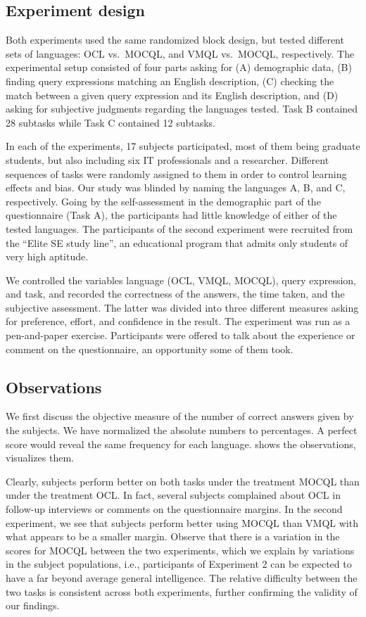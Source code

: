 \documentclass{llncs}
\newcommand{\MMQ}{MOCQL\xspace}
\begin{document}
\subsection{Experiment design}

Both experiments used the same randomized block design, but tested different sets of languages: OCL vs.\ \MMQ, and VMQL vs.\ \MMQ, respectively. The experimental setup consisted of four parts asking for (A) demographic data, (B) finding query expressions matching an English description, (C) checking the match between a given query expression and its English description, and (D) asking for subjective judgments regarding the languages tested. Task B contained 28 subtasks while Task C contained 12 subtasks. 

In each of the experiments, 17 subjects participated, most of them being graduate students, but also including six IT professionals and a researcher. Different sequences of tasks were randomly assigned to them in order to control learning effects and bias. Our study was blinded by naming the languages A, B, and C, respectively. Going by the self-assessment in the demographic part of the questionnaire (Task A), the participants had little knowledge of either of the tested languages. The participants of the second experiment were recruited from the ``Elite SE study line'', an educational program that admits only students of very high aptitude.

We controlled the variables language (OCL, VMQL, \MMQ), query expression, and task, and recorded the correctness of the answers, the time taken, and  the subjective assessment. The latter was divided into three different measures asking for preference, effort, and confidence in the result. The experiment was run as a pen-and-paper exercise. Participants were offered to talk about the experience or comment on the questionnaire, an opportunity some of them took. 



\subsection{Observations}

We first discuss the objective measure of the number of correct answers given by the subjects. We have normalized the absolute numbers to percentages. A perfect score would reveal the same frequency for each language.  shows the observations,  visualizes them.

Clearly, subjects perform better on both tasks under the treatment \MMQ than under the treatment OCL. In fact, several subjects complained about OCL in follow-up interviews or comments on the questionnaire margins. In the second experiment, we see that subjects perform better using \MMQ than VMQL with what appears to be a smaller margin. Observe that there is a variation in the scores for \MMQ between the two experiments, which we explain by variations in the subject populations, i.e., participants of Experiment 2 can be expected to have a far beyond average general intelligence. The relative difficulty between the two tasks is consistent across both experiments, further confirming the validity of our findings.
\end{document}
